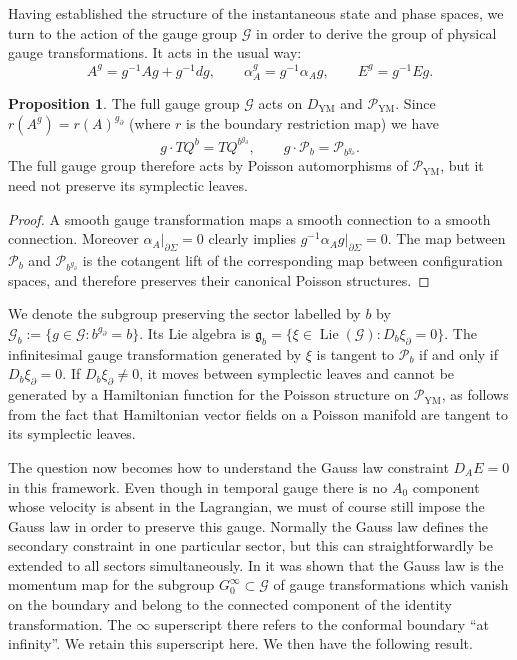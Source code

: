 \documentclass{article}
\theoremstyle{definition}
\newtheorem{proposition}[definition]{Proposition}
\begin{document}
Having established the structure of the instantaneous state and phase spaces, we turn to the action of the gauge group $\mathcal{G}$ in order to derive the group of physical gauge transformations. It acts in the usual way: 
\[
A^g=g^{-1}Ag+g^{-1}dg,
\qquad
\alpha_A^g=g^{-1}\alpha_Ag,
\qquad
E^g=g^{-1}Eg.
\]
\begin{proposition}\label{prop:gaugesectors}
The full gauge group \(\mathcal G\) acts on
\(D_{\mathrm{YM}}\) and \(\mathcal{P}_{\mathrm{YM}}\). Since $r(A^g)=r(A)^{g_\partial}$ (where $r$ is the boundary restriction map) we have
\[
g\cdot TQ^b=TQ^{b^{g_\partial}},
\qquad
g\cdot \mathcal{P}_b=\mathcal P_{b^{g_\partial}}.
\]
The full gauge group therefore acts by Poisson automorphisms of \(\mathcal{P}_{\mathrm{YM}}\), but it need not preserve its symplectic leaves.
\end{proposition}

\begin{proof}
A smooth gauge transformation maps a smooth connection to a smooth
connection. Moreover $\alpha_A|_{\partial\Sigma}=0$ clearly implies $g^{-1}\alpha_Ag|_{\partial\Sigma}=0$.
The map between \(\mathcal{P}_b\) and \(\mathcal P_{b^{g_\partial}}\) is the cotangent lift of the corresponding map between configuration spaces, and therefore preserves their canonical Poisson structures.
\end{proof}
We denote the subgroup preserving the sector labelled by \(b\) by $\mathcal G_b
:=
\{g\in\mathcal G:b^{g_\partial}=b\}.$
Its Lie algebra is $\mathfrak g_b
=
\{\xi\in\operatorname{Lie}(\mathcal G):
D_b\xi_\partial=0\}$. 
The infinitesimal gauge transformation generated by \(\xi\) is tangent
to \(\mathcal{P}_b\) if and only if $D_b\xi_\partial=0$.
If \(D_b\xi_\partial\neq0\), it moves between symplectic leaves and
cannot be generated by a Hamiltonian function for the Poisson
structure on \(\mathcal{P}_{\mathrm{YM}}\), as follows from the fact that Hamiltonian vector fields on a Poisson manifold are tangent to its
symplectic leaves.

The question now becomes how to understand the Gauss law constraint $D_AE=0$ in this framework. Even though in temporal gauge there is no $A_0$ component whose velocity is absent in the Lagrangian, we must of course still impose the Gauss law in order to preserve this gauge. Normally the Gauss law defines the secondary constraint in one particular sector, but this can straightforwardly be extended to all sectors simultaneously. In \cite{Borsboom:2025agn} it was shown that the Gauss law is the momentum map for the subgroup $G^\infty_0\subset\mathcal{G}$ of gauge transformations which vanish on the boundary and belong to the connected component of the identity transformation. The $\infty$ superscript there refers to the conformal boundary ``at infinity''. We retain this superscript here. We then have the following result.
\end{document}
